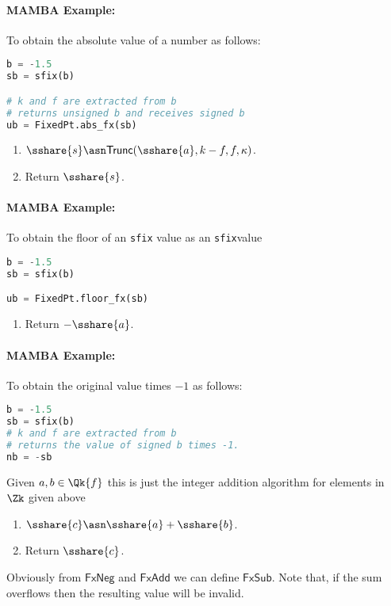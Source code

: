   \paragraph{MAMBA Example:} To obtain the absolute value of a number as follows:
  \begin{lstlisting}[language={python}]
b = -1.5
sb = sfix(b)

# k and f are extracted from b
# returns unsigned b and receives signed b
ub = FixedPt.abs_fx(sb)
\end{lstlisting}

  \begin{enumerate}
    \item $\sshare{s} \asn \mathsf{Trunc}(\sshare{a}, k-f, f, \kappa)$.
    \item Return $\sshare{s}$.
  \end{enumerate}

  \paragraph{MAMBA Example:} To obtain the floor of an \verb+sfix+ value
  as an \verb+sfix+value
  \begin{lstlisting}[language={python}]
b = -1.5
sb = sfix(b)

ub = FixedPt.floor_fx(sb)
\end{lstlisting}

  \begin{enumerate}
    \item Return $-\sshare{a}$.
  \end{enumerate}
  \paragraph{MAMBA Example:} To obtain the original value times $-1$ as follows:
  \begin{lstlisting}[language={python}]
b = -1.5
sb = sfix(b)
# k and f are extracted from b
# returns the value of signed b times -1.
nb = -sb
\end{lstlisting}
  Given $a, b \in \Qk{f}$ this is just the integer addition algorithm for elements
  in $\Zk$ given above
  \begin{enumerate}
    \item $\sshare{c} \asn \sshare{a} + \sshare{b}$.
    \item Return $\sshare{c}$.
  \end{enumerate}
  Obviously from $\mathsf{FxNeg}$ and $\mathsf{FxAdd}$ we can define $\mathsf{FxSub}$.
  Note that, if the sum overflows then the resulting value will be
  invalid.

